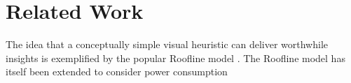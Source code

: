 \section{Related Work}
\label{sec:related}
The idea that a conceptually simple visual heuristic can deliver worthwhile insights is exemplified by the popular Roofline model \cite{williams:2009aa}. The Roofline model has itself been extended to consider power consumption \cite{choi:2013aa}  
